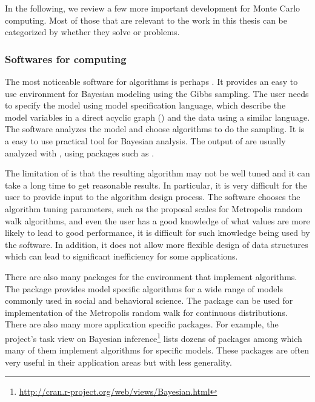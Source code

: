 In the following, we review a few more important development for Monte Carlo
computing. Most of those that are relevant to the work in this thesis can be
categorized by whether they solve \mcmc or \smc problems.

\subsubsection{Softwares for \protect\mcmc computing}
\label{ssub:Softwares for mcmc computing}

The most noticeable software for \mcmc algorithms is perhaps \bugs \cite{bugs,
  bugsbook}. It provides an easy to use environment for Bayesian modeling
using the Gibbs sampling. The user needs to specify the model using \bugs
model specification language, which describe the model variables in a direct
acyclic graph (\dag) and the data using a similar language. The software
analyzes the model and choose \mcmc algorithms to do the sampling. It is a
easy to use practical tool for Bayesian analysis. The output of \bugs are
usually analyzed with \rlang, using packages such as \rcoda \cite{rcoda}.

The limitation of \bugs is that the resulting algorithm may not be well tuned
and it can take a long time to get reasonable results. In particular, it is
very difficult for the user to provide input to the algorithm design process.
The software chooses the algorithm tuning parameters, such as the proposal
scales for Metropolis random walk algorithms, and even the user has a good
knowledge of what values are more likely to lead to good performance, it is
difficult for such knowledge being used by the software. In addition, it does
not allow more flexible design of data structures which can lead to
significant inefficiency for some applications.

There are also many packages for the \rlang environment that implement \mcmc
algorithms. The \rmcmcpack \cite{rmcmcpack} package provides model specific
\mcmc algorithms for a wide range of models commonly used in social and
behavioral science. The \rmcmc \cite{rmcmc} package can be used for
implementation of the Metropolis random walk for continuous distributions.
There are also many more application specific packages. For example, the
\rlang project's task view on Bayesian
inference\footnote{\url{http://cran.r-project.org/web/views/Bayesian.html}}
lists dozens of packages among which many of them implement \mcmc algorithms
for specific models. These packages are often very useful in their application
areas but with less generality.

